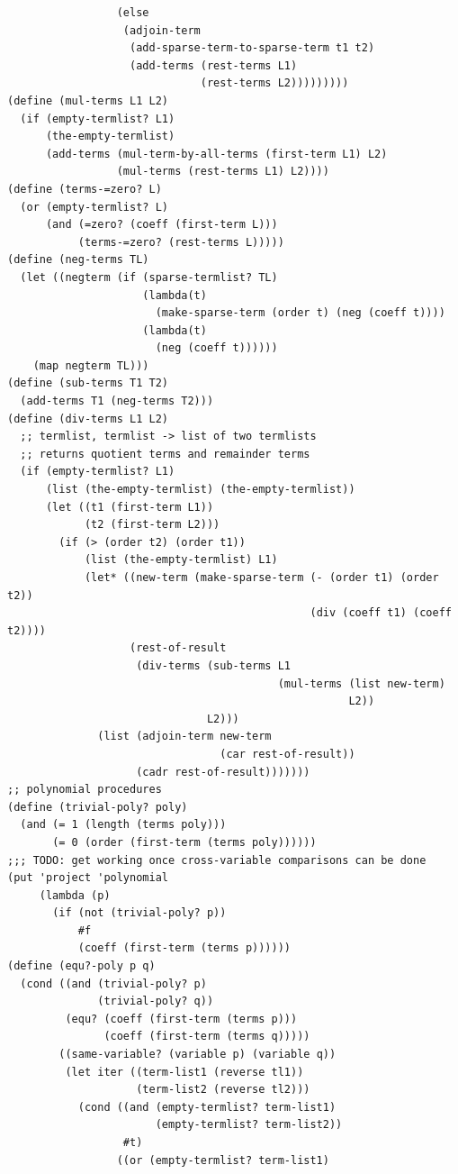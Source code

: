 \documentclass[final,fleqn,titlepage,twoside]{article}
\begin{document}
\begin{verbatim}
                 (else
                  (adjoin-term
                   (add-sparse-term-to-sparse-term t1 t2)
                   (add-terms (rest-terms L1)
                              (rest-terms L2)))))))))
(define (mul-terms L1 L2)
  (if (empty-termlist? L1)
      (the-empty-termlist)
      (add-terms (mul-term-by-all-terms (first-term L1) L2)
                 (mul-terms (rest-terms L1) L2))))
(define (terms-=zero? L)
  (or (empty-termlist? L)
      (and (=zero? (coeff (first-term L)))
           (terms-=zero? (rest-terms L)))))
(define (neg-terms TL)
  (let ((negterm (if (sparse-termlist? TL)
                     (lambda(t)
                       (make-sparse-term (order t) (neg (coeff t))))
                     (lambda(t)
                       (neg (coeff t))))))
    (map negterm TL)))
(define (sub-terms T1 T2)
  (add-terms T1 (neg-terms T2)))
(define (div-terms L1 L2)
  ;; termlist, termlist -> list of two termlists
  ;; returns quotient terms and remainder terms
  (if (empty-termlist? L1)
      (list (the-empty-termlist) (the-empty-termlist))
      (let ((t1 (first-term L1))
            (t2 (first-term L2)))
        (if (> (order t2) (order t1))
            (list (the-empty-termlist) L1)
            (let* ((new-term (make-sparse-term (- (order t1) (order t2))
                                               (div (coeff t1) (coeff t2))))
                   (rest-of-result
                    (div-terms (sub-terms L1
                                          (mul-terms (list new-term)
                                                     L2))
                               L2)))
              (list (adjoin-term new-term
                                 (car rest-of-result))
                    (cadr rest-of-result)))))))
;; polynomial procedures
(define (trivial-poly? poly)
  (and (= 1 (length (terms poly)))
       (= 0 (order (first-term (terms poly))))))
;;; TODO: get working once cross-variable comparisons can be done
(put 'project 'polynomial
     (lambda (p)
       (if (not (trivial-poly? p))
           #f
           (coeff (first-term (terms p))))))
(define (equ?-poly p q)
  (cond ((and (trivial-poly? p)
              (trivial-poly? q))
         (equ? (coeff (first-term (terms p)))
               (coeff (first-term (terms q)))))
        ((same-variable? (variable p) (variable q))
         (let iter ((term-list1 (reverse tl1))
                    (term-list2 (reverse tl2)))
           (cond ((and (empty-termlist? term-list1)
                       (empty-termlist? term-list2))
                  #t)
                 ((or (empty-termlist? term-list1)

\end{verbatim}
\end{document}
